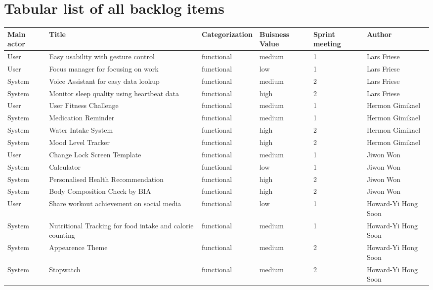 \documentclass{article}
\begin{document}
\section{Tabular list of all backlog items}
\begin{center}
	\small
	\vspace{0.5cm}
	\begin{tabularx}{\textwidth}{|p{}|X|p{}|p{}|p{}|p{}|}
		\hline
		\textbf{Main actor} & \textbf{Title} & \textbf{Categorization} & \textbf{Buisness Value} & \textbf{Sprint meeting} & \textbf{Author} \\
		\hline
		User & Easy usability with gesture control & functional & medium & 1 & Lars Friese \\ \hline
		User & Focus manager for focusing on work & functional & low & 1 & Lars Friese \\ \hline
		System & Voice Assistant for easy data lookup & functional & medium & 2 & Lars Friese \\ \hline
		System & Monitor sleep quality using heartbeat data & functional & high & 2 & Lars Friese \\ \hline
        User & User Fitness Challenge & functional & medium & 1 & Hermon Gimikael \\ \hline
		System & Medication Reminder & functional & medium & 1 & Hermon Gimikael \\ \hline
		System & Water Intake System & functional & high & 2 & Hermon Gimikael \\ \hline
		System & Mood Level Tracker & functional & high & 2 & Hermon Gimikael \\ \hline
		User & Change Lock Screen Template & functional & medium &  1 & Jiwon Won \\ \hline
		System & Calculator & functional & low &  1 & Jiwon Won \\ \hline
		System & Personalised Health Recommendation & functional & high &  2 & Jiwon Won \\ \hline 
		System & Body Composition Check by BIA & functional & high &  2 & Jiwon Won \\ \hline
		User & Share workout achievement on social media & functional & low & 1 & Howard-Yi Hong Soon \\ \hline
		System & Nutritional Tracking for food intake and calorie counting & functional & medium & 1 & Howard-Yi Hong Soon \\ \hline
		System & Appearence Theme & functional & medium & 2 & Howard-Yi Hong Soon \\ \hline
		System & Stopwatch & functional & medium & 2 & Howard-Yi Hong Soon \\ \hline


	\end{tabularx}
\end{center}
\end{document}
